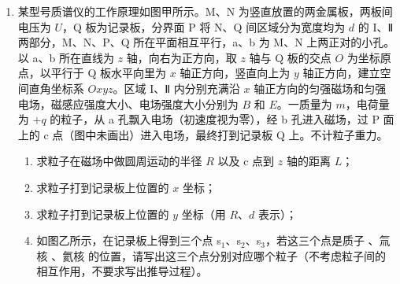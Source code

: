 \documentclass[\gkver]{gaokaozhenti}
\begin{document}
\begin{enumerate}
\item
某型号质谱仪的工作原理如图甲所示。M、N 为竖直放置的两金属板，两板间电压为 $U$，Q 板为记录板，分界面 P 将 N、Q 间区域分为宽度均为 $d$ 的 I、Ⅱ两部分，M、N、P、Q 所在平面相互平行，a、b 为 M、N 上两正对的小孔。以 a、b 所在直线为 $z$ 轴，向右为正方向，取 $z$ 轴与 Q 板的交点 $O$ 为坐标原点，以平行于 Q 板水平向里为 $x$ 轴正方向，竖直向上为 $y$ 轴正方向，建立空间直角坐标系 $Oxyz$。区域 I、Ⅱ 内分别充满沿 $x$ 轴正方向的匀强磁场和匀强电场，磁感应强度大小、电场强度大小分别为 $B$ 和 $E$。一质量为 $m$，电荷量为 $+q$ 的粒子，从 a 孔飘入电场（初速度视为零），经 b 孔进入磁场，过 P 面上的 c 点（图中未画出）进入电场，最终打到记录板 Q 上。不计粒子重力。
\begin{enumerate}
\item
求粒子在磁场中做圆周运动的半径 $R$ 以及 c 点到 $z$ 轴的距离 $L$；

\item
求粒子打到记录板上位置的 $x$ 坐标；

\item
求粒子打到记录板上位置的 $y$ 坐标（用 $R$、$d$ 表示）；

\item
如图乙所示，在记录板上得到三个点 s$_{1}$、s$_{2}$、s$_{3}$，若这三个点是质子 、氚核 、氦核  的位置，请写出这三个点分别对应哪个粒子（不考虑粒子间的相互作用，不要求写出推导过程）。
\end{enumerate}


\end{enumerate}
\end{document}
